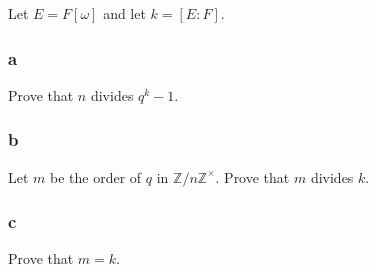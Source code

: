 Let \(E = F [\omega]\) and let \(k = [E : F]\).

\hypertarget{a-51}{%
\subsubsection{a}\label{a-51}}

Prove that \(n\) divides \(q^{k}-1\).

\hypertarget{b-41}{%
\subsubsection{b}\label{b-41}}

Let \(m\) be the order of \(q\) in
\({\mathbb{Z}}/n{\mathbb{Z}}^{\times}\). Prove that \(m\) divides \(k\).

\hypertarget{c-27}{%
\subsubsection{c}\label{c-27}}

Prove that \(m = k\).


